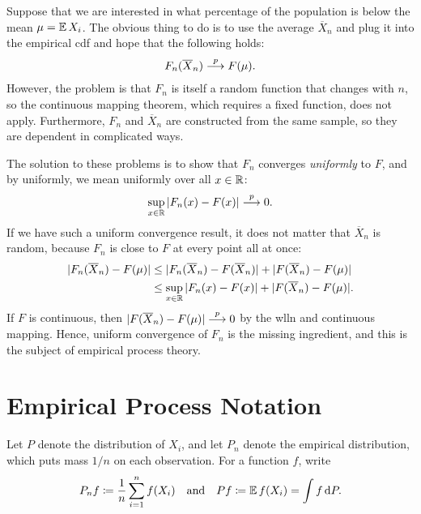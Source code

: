 \documentclass[a4paper,12pt]{article}
\begin{document}
\begin{example}\label{ex-mean}
	Suppose that we are interested in what percentage of the population is below the mean $\mu=\operatorname{\mathbb{E}} X_i$.
	The obvious thing to do is to use the average $\overline X_n$
	and plug it into the empirical \gls{cdf} and hope that the following holds:
	\begin{align}
		F_n(\overline X_n) \overset{p}{\longrightarrow} F(\mu).
	\end{align}
	However, the problem is that
	$F_n$ is itself a random function that changes with $n$,
	so the continuous mapping theorem, which requires a fixed function, does not apply.
	Furthermore, $F_n$ and $\overline X_n$ are constructed from the same sample, so they are dependent in complicated ways.
\end{example}

\begin{remark}[Uniformity]
	The solution to these problems is to show that $F_n$ converges \emph{uniformly} to $F$,
	and by uniformly, we mean uniformly over all $x\in\mathbb{R}$:
	\begin{align}\label{eq-cdf-uniform-convergence}
		\sup_{x\in\mathbb{R}}|F_n(x)-F(x)| \overset{p}{\longrightarrow} 0.
	\end{align}
	If we have such a uniform convergence result,
	it does not matter that $\overline X_n$ is random,
	because $F_n$ is close to $F$ at every point all at once:
	\begin{align}
		\begin{aligned}
			|F_n(\overline X_n)-F(\mu)|
			&\le |F_n(\overline X_n)-F(\overline X_n)| + |F(\overline X_n)-F(\mu)| \\
			&\le \sup_{x\in\mathbb{R}}|F_n(x)-F(x)| + |F(\overline X_n)-F(\mu)|.
		\end{aligned}
	\end{align}
	If $F$ is continuous, then $|F(\overline X_n)-F(\mu)|\overset{p}{\longrightarrow}0$ by the \gls{wlln} and continuous mapping.
	Hence, uniform convergence of $F_n$ is the missing ingredient,
	and this is the subject of empirical process theory.
\end{remark}

\section{Empirical Process Notation}

\begin{definition}
	Let $P$ denote the distribution of $X_i$, and let $P_n$ denote the empirical distribution,
	which puts mass $1/n$ on each observation.
	For a function $f$, write
	\begin{gather}
		P_nf\coloneqq\frac1n\sum_{i=1}^nf(X_i)
		\quad\text{and}\quad
		Pf\coloneqq\operatorname{\mathbb{E}} f(X_i)=\int f\mathop{}\!{\mathrm{d}}{P}.
	\end{gather}
\end{definition}
\end{document}
